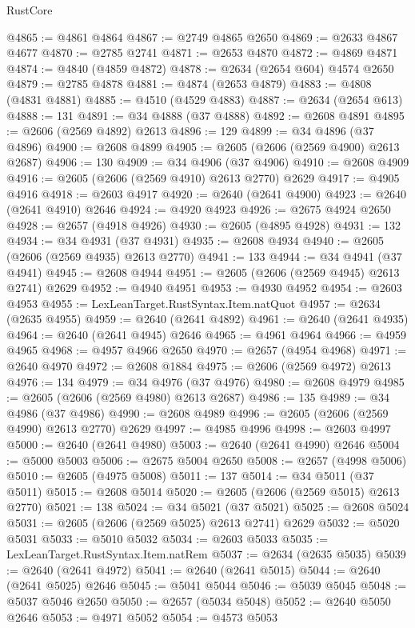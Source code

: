 \begin{lexlean}{RustCore}
\begin{coremodule}
@4865 := @4861 @4864
@4867 := @2749 @4865 @2650
@4869 := @2633 @4867 @4677
@4870 := @2785 @2741
@4871 := @2653 @4870
@4872 := @4869 @4871
@4874 := @4840 (@4859 @4872)
@4878 := @2634 (@2654 @604) @4574 @2650
@4879 := @2785 @4878
@4881 := @4874 (@2653 @4879)
@4883 := @4808 (@4831 @4881)
@4885 := @4510 (@4529 @4883)
@4887 := @2634 (@2654 @613)
@4888 := 131
@4891 := @34 @4888 (@37 @4888)
@4892 := @2608 @4891
@4895 := @2606 (@2569 @4892) @2613
@4896 := 129
@4899 := @34 @4896 (@37 @4896)
@4900 := @2608 @4899
@4905 := @2605 (@2606 (@2569 @4900) @2613 @2687)
@4906 := 130
@4909 := @34 @4906 (@37 @4906)
@4910 := @2608 @4909
@4916 := @2605 (@2606 (@2569 @4910) @2613 @2770) @2629
@4917 := @4905 @4916
@4918 := @2603 @4917
@4920 := @2640 (@2641 @4900)
@4923 := @2640 (@2641 @4910) @2646
@4924 := @4920 @4923
@4926 := @2675 @4924 @2650
@4928 := @2657 (@4918 @4926)
@4930 := @2605 (@4895 @4928)
@4931 := 132
@4934 := @34 @4931 (@37 @4931)
@4935 := @2608 @4934
@4940 := @2605 (@2606 (@2569 @4935) @2613 @2770)
@4941 := 133
@4944 := @34 @4941 (@37 @4941)
@4945 := @2608 @4944
@4951 := @2605 (@2606 (@2569 @4945) @2613 @2741) @2629
@4952 := @4940 @4951
@4953 := @4930 @4952
@4954 := @2603 @4953
@4955 := LexLeanTarget.RustSyntax.Item.natQuot
@4957 := @2634 (@2635 @4955)
@4959 := @2640 (@2641 @4892)
@4961 := @2640 (@2641 @4935)
@4964 := @2640 (@2641 @4945) @2646
@4965 := @4961 @4964
@4966 := @4959 @4965
@4968 := @4957 @4966 @2650
@4970 := @2657 (@4954 @4968)
@4971 := @2640 @4970
@4972 := @2608 @1884
@4975 := @2606 (@2569 @4972) @2613
@4976 := 134
@4979 := @34 @4976 (@37 @4976)
@4980 := @2608 @4979
@4985 := @2605 (@2606 (@2569 @4980) @2613 @2687)
@4986 := 135
@4989 := @34 @4986 (@37 @4986)
@4990 := @2608 @4989
@4996 := @2605 (@2606 (@2569 @4990) @2613 @2770) @2629
@4997 := @4985 @4996
@4998 := @2603 @4997
@5000 := @2640 (@2641 @4980)
@5003 := @2640 (@2641 @4990) @2646
@5004 := @5000 @5003
@5006 := @2675 @5004 @2650
@5008 := @2657 (@4998 @5006)
@5010 := @2605 (@4975 @5008)
@5011 := 137
@5014 := @34 @5011 (@37 @5011)
@5015 := @2608 @5014
@5020 := @2605 (@2606 (@2569 @5015) @2613 @2770)
@5021 := 138
@5024 := @34 @5021 (@37 @5021)
@5025 := @2608 @5024
@5031 := @2605 (@2606 (@2569 @5025) @2613 @2741) @2629
@5032 := @5020 @5031
@5033 := @5010 @5032
@5034 := @2603 @5033
@5035 := LexLeanTarget.RustSyntax.Item.natRem
@5037 := @2634 (@2635 @5035)
@5039 := @2640 (@2641 @4972)
@5041 := @2640 (@2641 @5015)
@5044 := @2640 (@2641 @5025) @2646
@5045 := @5041 @5044
@5046 := @5039 @5045
@5048 := @5037 @5046 @2650
@5050 := @2657 (@5034 @5048)
@5052 := @2640 @5050 @2646
@5053 := @4971 @5052
@5054 := @4573 @5053

\end{coremodule}
\end{lexlean}

